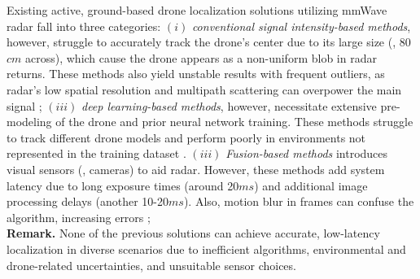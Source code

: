 Existing active, ground-based drone localization solutions utilizing mmWave radar fall into three categories:
$(i)$ \textit{conventional signal intensity-based methods}, however, struggle to accurately track the drone’s center due to its large size (\eg, 80$cm$ across), which cause the drone appears as a non-uniform blob in radar returns. These methods also yield unstable results with frequent outliers, as radar’s low spatial resolution and multipath scattering can overpower the main signal \tocite;
$(iii)$ \textit{deep learning-based methods}, however, necessitate extensive pre-modeling of the drone and prior neural network training. These methods struggle to track different drone models and perform poorly in environments not represented in the training dataset \tocite. 
$(iii)$ \textit{Fusion-based methods} introduces visual sensors (\eg, cameras) to aid radar. However, these methods add system latency due to long exposure times (around 20$ms$) and additional image processing delays (another 10-20$ms$). Also, motion blur in frames can confuse the algorithm, increasing errors \tocite;\\
\textbf{Remark.} None of the previous solutions can achieve accurate, low-latency localization in diverse scenarios due to inefficient algorithms, environmental and drone-related uncertainties, and unsuitable sensor choices.

